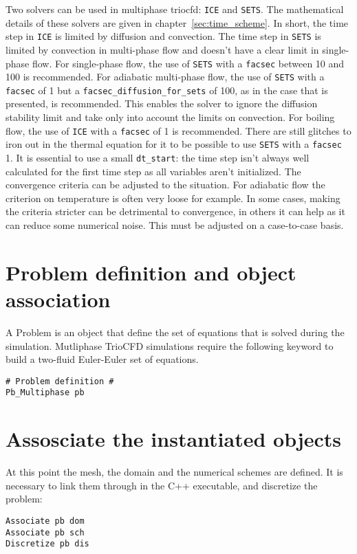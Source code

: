 Two solvers can be used in multiphase triocfd: \texttt{ICE} and \texttt{SETS}.
The mathematical details of these solvers are given in chapter~\ref{sec:time_scheme}.
In short, the time step in \texttt{ICE} is limited by diffusion and convection.
The time step in \texttt{SETS} is limited by convection in multi-phase flow and doesn't have a clear limit in single-phase flow.
For single-phase flow, the use of \texttt{SETS} with a \texttt{facsec} between 10 and 100 is recommended.
For adiabatic multi-phase flow, the use of \texttt{SETS} with a \texttt{facsec} of 1 but a \texttt{facsec\_diffusion\_for\_sets} of 100, as in the case that is presented, is recommended.
This enables the solver to ignore the diffusion stability limit and take only into account the limits on convection.
For boiling flow, the use of \texttt{ICE} with a \texttt{facsec} of 1 is recommended. 
There are still glitches to iron out in the thermal equation for it to be possible to use \texttt{SETS} with a \texttt{facsec} 1.
It is essential to use a small \texttt{dt\_start}: the time step isn't always well calculated for the first time step as all variables aren't initialized.
The convergence criteria can be adjusted to the situation. 
For adiabatic flow the criterion on temperature is often very loose for example.
In some cases, making the criteria stricter can be detrimental to convergence, in others it can help as it can reduce some numerical noise.
This must be adjusted on a case-to-case basis.

\section{Problem definition and object association}\label{data:problem}
A Problem is an object that define the set of equations that is solved during the simulation. 
Mutliphase TrioCFD simulations require the following keyword to build a two-fluid Euler-Euler set of equations.
\begin{lstlisting}
# Problem definition #
Pb_Multiphase pb
\end{lstlisting}
\section{Assosciate the instantiated objects}\label{data:associate}
At this point the mesh, the domain and the numerical schemes are defined. 
It is necessary to link them through in the C++ executable, and discretize the problem:
\begin{lstlisting}
Associate pb dom
Associate pb sch
Discretize pb dis
\end{lstlisting}

